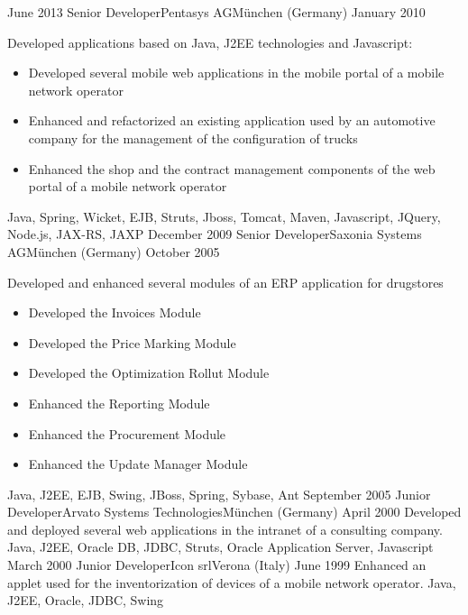 \begin{experiences}
  \emptySeparator
  \experience
    {June 2013}    {Senior Developer}{Pentasys AG}{München (Germany)}
    {January 2010} {Developed applications based on Java, J2EE technologies and Javascript:   
                      \begin{itemize}
                        \item Developed several mobile web applications in the mobile portal of a mobile network operator
                        \item Enhanced and refactorized an existing application used by an automotive company for the management of the configuration of trucks                 
                        \item Enhanced the shop and the contract management components of the web portal of a mobile network operator
                      \end{itemize}
                    }
                    {Java, Spring, Wicket, EJB, Struts, Jboss, Tomcat, Maven, Javascript, JQuery, Node.js, JAX-RS, JAXP}
  \emptySeparator
  \experience
  {December 2009}   {Senior Developer}{Saxonia Systems AG}{München (Germany)}
  {October 2005}    {
  					    Developed and enhanced several modules of an ERP application for drugstores
  					    \begin{itemize}
                        	\item Developed the Invoices Module
							\item Developed the Price Marking Module
							\item Developed the Optimization Rollut Module
                        	\item Enhanced the Reporting Module
                        	\item Enhanced the Procurement Module
    						\item Enhanced the Update Manager Module
                    	\end{itemize}
  					 }
                    {Java, J2EE, EJB, Swing, JBoss, Spring, Sybase, Ant}
  \emptySeparator
  \consultantexperience
  {September 2005}   {Junior Developer}{Arvato Systems Technologies}{München (Germany)}
  {April 2000}       {
                     	  Developed and deployed several web applications in the intranet of a consulting company.
                     }
                     {Java, J2EE, Oracle DB, JDBC, Struts, Oracle Application Server, Javascript}
  \emptySeparator
  \consultantexperience
  {March 2000}  	{Junior Developer}{Icon srl}{Verona (Italy)}
  {June 1999}   	{ 
  				 		Enhanced an applet used for the inventorization of devices of a mobile network operator.
  				 	}
                	{Java, J2EE, Oracle, JDBC, Swing} 
\end{experiences}

